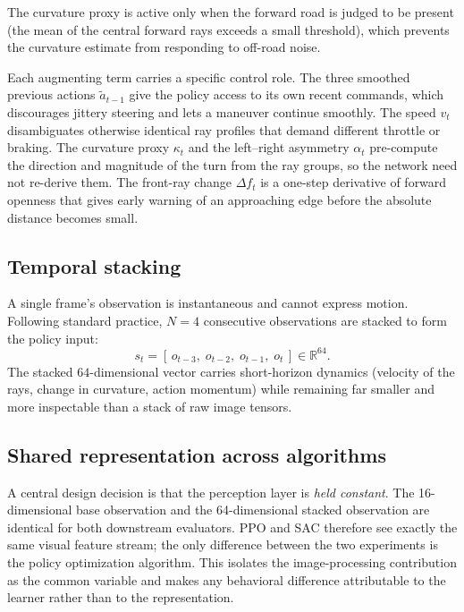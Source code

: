 \documentclass[conference]{IEEEtran}
\begin{document}
The curvature proxy is active only when the forward road is judged to be
present (the mean of the central forward rays exceeds a small threshold),
which prevents the curvature estimate from responding to off-road noise.

Each augmenting term carries a specific control role. The three smoothed previous
actions $\tilde a_{t-1}$ give the policy access to its own recent commands, which
discourages jittery steering and lets a maneuver continue smoothly. The speed
$v_t$ disambiguates otherwise identical ray profiles that demand different
throttle or braking. The curvature proxy $\kappa_t$ and the left--right asymmetry
$\alpha_t$ pre-compute the direction and magnitude of the turn from the ray
groups, so the network need not re-derive them. The front-ray change $\Delta f_t$
is a one-step derivative of forward openness that gives early warning of an
approaching edge before the absolute distance becomes small.

\subsection{Temporal stacking}

A single frame's observation is instantaneous and cannot express motion.
Following standard practice, $N=4$ consecutive observations are stacked to
form the policy input:
\begin{equation}
s_t = [\,o_{t-3},\; o_{t-2},\; o_{t-1},\; o_t\,] \in \mathbb{R}^{64}.
\end{equation}
The stacked $64$-dimensional vector carries short-horizon dynamics (velocity of
the rays, change in curvature, action momentum) while remaining far smaller and
more inspectable than a stack of raw image tensors.

\subsection{Shared representation across algorithms}

A central design decision is that the perception layer is \emph{held constant}.
The 16-dimensional base observation and the 64-dimensional stacked observation
are identical for both downstream evaluators. PPO and SAC therefore see exactly
the same visual feature stream; the only difference between the two experiments
is the policy optimization algorithm. This isolates the image-processing
contribution as the common variable and makes any behavioral difference
attributable to the learner rather than to the representation.
\end{document}
